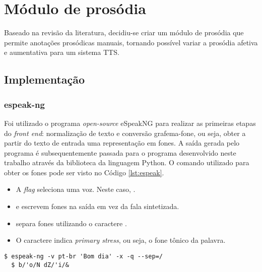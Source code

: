 
\simb[ms (milissegundos)]
\simb[Hz (Hertz)]

\chapter{Módulo de prosódia}
Baseado na revisão da literatura, decidiu-se criar um módulo de prosódia que
permite anotações prosódicas manuais, tornando possível variar a prosódia
afetiva e aumentativa para um sistema TTS.

\section{Implementação}
\subsection{espeak-ng}
Foi utilizado o programa \emph{open-source} eSpeakNG \cite{espeakng} para
realizar as primeiras etapas do \emph{front end}: normalização de texto e
conversão grafema-fone, ou seja, obter a partir do texto de entrada uma
representação em fones. A saída gerada pelo programa é subsequentemente passada
para o programa desenvolvido neste trabalho através da biblioteca
 da linguagem Python. O comando utilizado para obter os
fones pode ser visto no Código \ref{lst:espeak}.

\begin{itemize}
\item A \emph{flag}  seleciona uma voz. Neste caso, .
\item {} e  escrevem fones na saída em vez da fala sintetizada.
\item {} separa fones utilizando o caractere \code{/}.
\item O caractere \code{\'} indica \emph{primary stress}, ou seja, o fone tônico
da palavra.
\end{itemize}

\begin{lstlisting}[caption=Utilização do programa espeak e saída correspondente,
  label=lst:espeak]
  $ espeak-ng -v pt-br 'Bom dia' -x -q --sep=/
  $ b/'o/N dZ/'i/&
\end{lstlisting}


